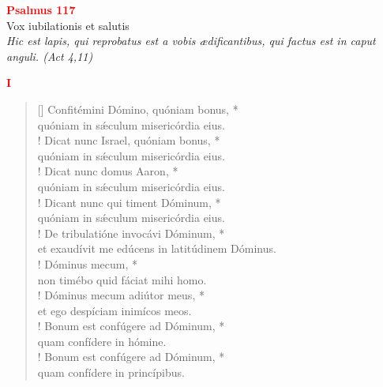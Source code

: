 
\def\greinitialformat#1{%
{\fontsize{43}{43}\selectfont #1}%
}




\vspace{0.3cm}
\begin{center}
 \textcolor{red}{\large \bf Psalmus 117}\\
Vox iubilationis et salutis\\
\textit{\small Hic est lapis, qui reprobatus est a vobis ædificantibus, qui factus est in caput anguli. (Act 4,11)}
\end{center}
\begin{center}
\textcolor{red}{\bf I}
\end{center}
\begin{verse}[\versewidth]
Confitémini Dómino, quóniam bonus, *\\
quóniam in s\'{æ}culum misericórdia eius.\\!
\vin  Dicat nunc Israel, quóniam bonus, *\\
\vin  quóniam in s\'{æ}culum misericórdia eius.\\!
Dicat nunc domus Aaron, *\\
quóniam in s\'{æ}culum misericórdia eius.\\!
\vin  Dicant nunc qui timent Dóminum, *\\
\vin  quóniam in s\'{æ}culum misericórdia eius.\\!
De tribulatióne invocávi Dóminum, *\\
et exaudívit me edúcens in latitúdinem Dóminus.\\!
\vin Dóminus mecum, *\\
\vin non timébo quid fáciat mihi homo.\\!
Dóminus mecum adiútor meus, *\\
et ego despíciam inimícos meos.\\!
\vin Bonum est confúgere ad Dóminum, *\\
\vin quam confídere in hómine.\\!
Bonum est confúgere ad Dóminum, *\\
quam confídere in princípibus.\\
\end{verse}
